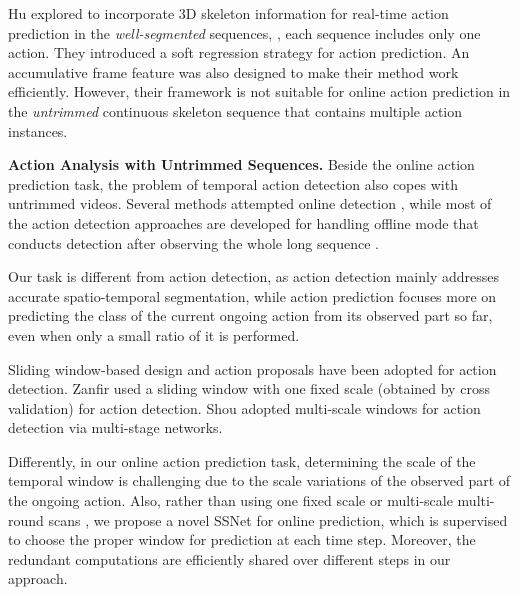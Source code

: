 \documentclass[10pt,twocolumn,letterpaper]{article}
\begin{document}
Hu \etal \cite{hu2016real} explored to incorporate 3D skeleton information for real-time action prediction in the \emph{well-segmented} sequences,
\ie, each sequence includes only one action.
They introduced a soft regression strategy for action prediction.
An accumulative frame feature was also designed to make their method work efficiently.
However, their framework is not suitable for online action prediction in the \emph{untrimmed} continuous skeleton sequence
that contains multiple action instances.






\textbf{Action Analysis with Untrimmed Sequences.}
Beside the online action prediction task,
the problem of temporal action detection \cite{wei2013concurrent,yeung2016end,gao2017turn,oneata2014lear,lea2016temporal,dai2017temporal,sharaf2015real,gao2017red,wei2013concurrent,shou2017cdc,gao2017cascaded,wang2017untrimmednets,zhao2017temporal} also copes with untrimmed videos.
Several methods attempted online detection \cite{li2016online},
while most of the action detection approaches are developed for handling offline mode that conducts detection after observing the whole long sequence \cite{oneata2014lear,li2017skeleton,siva2011weakly}.

Our task is different from action detection,
as action detection mainly addresses accurate spatio-temporal segmentation,
while action prediction focuses more on predicting the class of the current ongoing action from its observed part so far,
even when only a small ratio of it is performed. 

Sliding window-based design \cite{zanfir2013moving,sharaf2015real,baek2017real,hoai2014max} and action proposals \cite{dai2017temporal} have been adopted for action detection.
Zanfir \etal \cite{zanfir2013moving} used a sliding window with one fixed scale (obtained by cross validation) for action detection.
Shou \etal \cite{shou2016temporal} adopted multi-scale windows for action detection via multi-stage networks.

Differently, in our online action prediction task,
determining the scale of the temporal window is challenging due to the scale variations of the observed part of the ongoing action. Also, rather than using one fixed scale \cite{zanfir2013moving} or multi-scale multi-round scans \cite{shou2016temporal,zhu2017efficient},
we propose a novel SSNet for online prediction, which is supervised to choose the proper window for prediction at each time step.
Moreover, the redundant computations are efficiently shared over different steps in our approach. 
\end{document}
